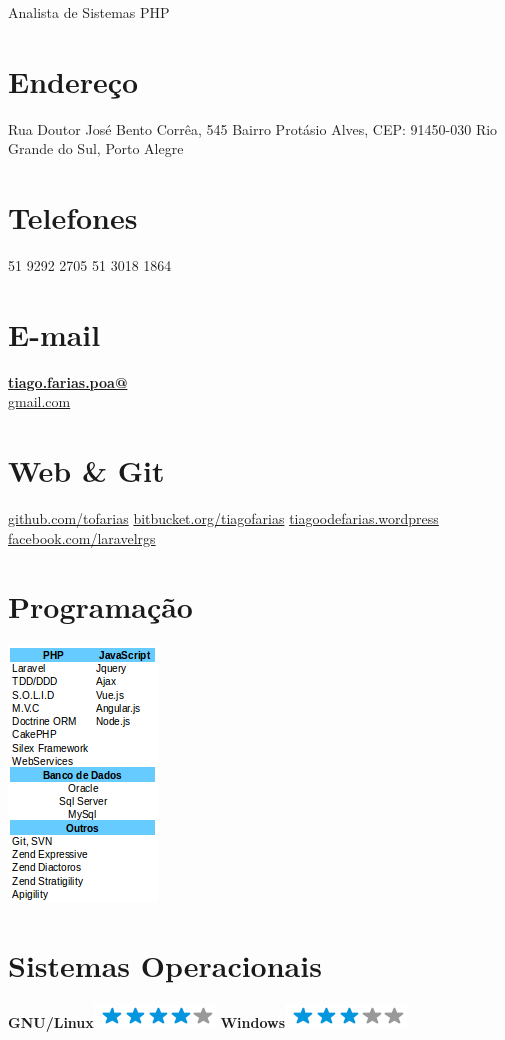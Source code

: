 \documentclass[]{friggeri-cv}
\begin{document}
      {Analista de Sistemas PHP}
      

\begin{aside}
  \section{Endereço}  	
    Rua Doutor José Bento Corrêa, 545
    Bairro Protásio Alves,
    CEP: 91450-030
    Rio Grande do Sul, Porto Alegre
    ~
  \section{Telefones}
    51 9292 2705
    51 3018 1864
    ~
  \section{E-mail}
    \href{mailto:tiago.farias.poa@gmail.com}{\textbf{tiago.farias.poa@}\\gmail.com}
    ~
  \section{Web \& Git}
    \href{https://github.com/tofarias}{github.com/tofarias}
    \href{https://bitbucket.org/tiagofarias}{bitbucket.org/tiagofarias}
    \href{https://tiagoodefarias.wordpress.com/}{tiagoodefarias.wordpress}
    \href{https://www.facebook.com/groups/laravelrgs}{facebook.com/laravelrgs}
    ~
  \section{Programação}
    \includegraphics[scale=0.62]{img/programacao.png}
    ~
  \section{Sistemas Operacionais}
    \textbf{GNU/Linux}\includegraphics[scale=0.40]{img/4stars.png}
    \textbf{Windows}\includegraphics[scale=0.40]{img/3stars.png}
    ~

\end{aside}
\end{document}
